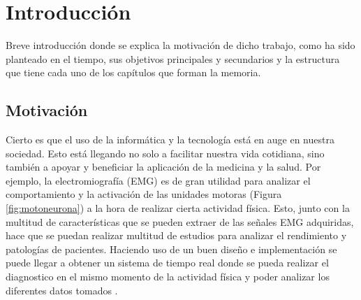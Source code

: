 \chapter{ Introducción}
Breve introducción donde se explica la motivación de dicho trabajo, como ha sido planteado en el tiempo, sus objetivos principales y secundarios y la estructura que tiene cada uno de los capítulos que forman la memoria.
\section{Motivación}
Cierto es que el uso de la informática y la tecnología está en auge en nuestra sociedad. Esto está llegando no solo a facilitar nuestra vida cotidiana, sino también a apoyar y beneficiar la aplicación de la medicina y la salud. Por ejemplo, la electromiografía (EMG) es de gran utilidad para analizar el comportamiento y la activación de las unidades motoras (Figura \ref{fig:motoneurona}) a la hora de realizar cierta actividad física. Esto, junto con la multitud de características que se pueden extraer de las señales EMG adquiridas, hace que se puedan realizar multitud de estudios para analizar el rendimiento y patologías de pacientes. Haciendo uso de un buen diseño e implementación se puede llegar a obtener un sistema de tiempo real donde se pueda realizar el diagnostico en el mismo momento de la actividad física y poder analizar los diferentes datos tomados \cite{konrad2005abc}.

